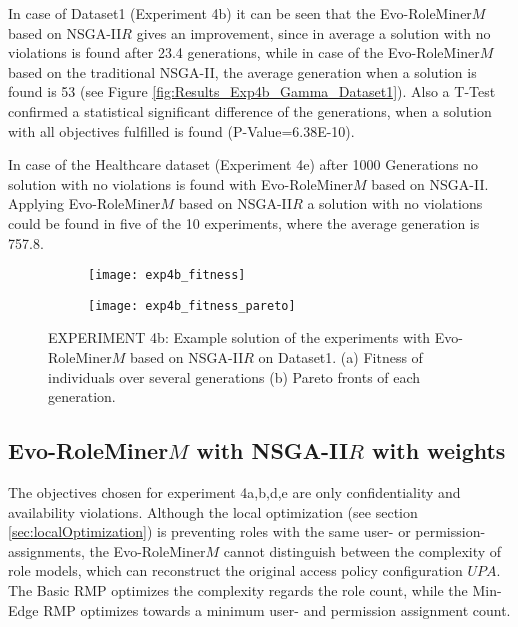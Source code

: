 In case of Dataset1 (Experiment 4b) it can be seen that the Evo-RoleMiner$M$ based on NSGA-II$R$ gives an improvement, since in average a solution with no violations is found after 23.4 generations, while in case of the Evo-RoleMiner$M$ based on the traditional NSGA-II, the average generation when a solution is found is 53 (see Figure \ref{fig:Results_Exp4b_Gamma_Dataset1}). Also a T-Test confirmed a statistical significant difference of the generations, when a solution with all objectives fulfilled is found (P-Value=6.38E-10).

In case of the Healthcare dataset (Experiment 4e) after 1000 Generations no solution with no violations is found with Evo-RoleMiner$M$ based on NSGA-II. Applying Evo-RoleMiner$M$ based on NSGA-II$R$ a solution with no violations could be found in five of the 10 experiments, where the average generation is 757.8.

\begin{figure}[H]
	\centering
	\begin{subfigure}{\textwidth}
		\centering
		\texttt{[image: exp4b\_fitness]}
		\caption{}
		\label{fig:exp4b_fitness_A}
	\end{subfigure}
	\begin{subfigure}{\textwidth}
		\centering
		\texttt{[image: exp4b\_fitness\_pareto]}
		\caption{}
		\label{fig:exp4b_fitness_B}
	\end{subfigure}
	\caption{EXPERIMENT 4b: Example solution of the experiments with Evo-RoleMiner$M$ based on NSGA-II$R$ on Dataset1. (a) Fitness of individuals over several generations (b) Pareto fronts of each generation.}
	\label{fig:exp4b_fitness}
\end{figure}


\subsection{Evo-RoleMiner$M$ with NSGA-II$R$ with weights}
\label{sec:exp_nsga2rweights}
The objectives chosen for experiment 4a,b,d,e are only confidentiality and availability violations. Although the local optimization (see section \ref{sec:localOptimization}) is preventing roles with the same user- or permission-assignments, the Evo-RoleMiner$M$ cannot distinguish between the complexity of role models, which can reconstruct the original access policy configuration $UPA$. The Basic RMP optimizes the complexity regards the role count, while the Min-Edge RMP optimizes towards a minimum user- and permission assignment count.

